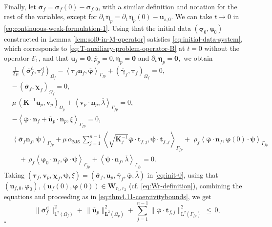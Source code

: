 \documentclass[11pt]{article}
\numberwithin{equation}{section}
\newcommand{\ds}{\displaystyle}
\newcommand{\bgamma}{{\boldsymbol\gamma}}
\newcommand{\bbeta}{{\boldsymbol\eta}}
\newcommand{\bsi}{{\boldsymbol\sigma}}
\newcommand{\bvarphi}{{\boldsymbol\varphi}}
\newcommand{\bpsi}{{\boldsymbol\psi}}
\newcommand{\btau}{{\boldsymbol\tau}}
\newcommand{\bchi}{{\boldsymbol\chi}}
\newcommand{\ubsi}{\underline{\bsi}}
\newcommand{\ubu}{\underline{\bu}}
\newcommand{\bv}{{\mathbf{v}}}
\newcommand{\bu}{\mathbf{u}}
\newcommand{\bt}{{\mathbf{t}}}
\newcommand{\bn}{{\mathbf{n}}}
\newcommand{\0}{{\mathbf{0}}}
\def\bK{\mathbf{K}}
\def\bW{\mathbf{W}}
\newcommand{\bL}{\mathbf{L}}
\newcommand\bbL{\mathbb{L}}
\newcommand{\cE}{\mathcal{E}}
\def\L{\mathrm{L}}
\def\rd{\mathrm{d}}
\def\BJS{\mathtt{BJS}}
\def\pil{\left<}
\def\pir{\right>}
\newenvironment{proof}{\noindent{\it Proof.}}{\hfill$\square$}
\numberwithin{equation}{section}
\begin{document}
\begin{proof}
Finally, let $\overline{\bsi}_f =\bsi_f(0) - \bsi_{f,0}$, with a similar definition and notation for the rest of the variables, except for $\overline{\partial_t\,\bbeta}_{p} = \partial_t\,\bbeta_{p}(0) - \bu_{s,0}$. 
We can take $t \to 0$ in \eqref{eq:continuous-weak-formulation-1}. 
Using that the initial data $(\ubsi_0,\ubu_0)$ constructed in Lemma \ref{lem:sol0-in-M-operator} satisfies \eqref{eq:initial-data-system}, which corresponds to \eqref{eq:T-auxiliary-problem-operator-B} at $t=0$ without the operator $\cE_1$, and that $\overline{\bu}_{f} = \0, \overline{p}_{p} = 0, \overline{\bbeta}_{p} = \0 $ and $\overline{\partial_t\,\bbeta}_{p} = \0,$ we obtain
\begin{subequations}\label{eq:init-0}
\begin{align}
&\ds  \frac{1}{2\,\mu}\,(\overline{\bsi}^\rd_f,\btau^\rd_f)_{\Omega_f} - \pil\btau_f\bn_f,\overline{\bvarphi} \pir_{\Gamma_{fp}} + (\overline{\bgamma}_f,\btau_f)_{\Omega_f} =0, \label{init-1} \\[1ex]
& \ds -\,(\overline{\bsi}_f,\bchi_f)_{\Omega_f} = 0, \label{init-2} \\[1ex]
& \ds \mu\,(\bK^{-1}\overline{\bu}_p,\bv_p)_{\Omega_p} + \pil\bv_p\cdot\bn_p,\overline{\lambda}\pir_{\Gamma_{fp}} = 0, \label{init-3} \\[1ex]
& \ds - \pil\overline{\bvarphi}\cdot\bn_f + \overline{\bu}_p\cdot\bn_p,\xi\pir_{\Gamma_{fp}} = 0, \label{init-4} \\[1ex]
& \ds \pil\overline{\bsi}_f\bn_f,\bpsi\pir_{\Gamma_{fp}} + \mu\,\alpha_{\BJS}\,\sum_{j=1}^{n-1} \pil\sqrt{\bK^{-1}_j} \overline{\bvarphi} \cdot\bt_{f,j},\bpsi\cdot\bt_{f,j} \pir_{\Gamma_{fp}}   +\,\, \rho_f\pil \overline{\bvarphi}\cdot\bn_f, \bvarphi(0)\cdot\bpsi \pir_{\Gamma_{fp}} \nonumber \\[2ex]
& \ds\quad +\, \rho_f\pil \bvarphi_0\cdot\bn_f, \overline{\bvarphi}\cdot\bpsi \pir_{\Gamma_{fp}}+ \pil\bpsi\cdot\bn_f,\overline{\lambda}\pir_{\Gamma_{fp}} = 0.\label{init-5} 
\end{align}
\end{subequations}
Taking $(\btau_f,\bv_p,\bchi_f,\bpsi, \xi) = (\overline{\bsi}_f,\overline{\bu}_p,\overline{\bgamma}_f,\overline{\bvarphi},\overline{\lambda})$ in \eqref{eq:init-0}, using that $(\bu_{f,0},\bvarphi_0), (\bu_{f}(0),\bvarphi(0))\in \bW_{r_1,r_2}$ (cf. \eqref{eq:Wr-definition}), combining the equations and proceeding as in  \eqref{eq:thm4.11-coercivitybounds}, we get
\begin{equation*}
\,\|\overline{\bsi}^\rd_f \|^2_{\bbL^2(\Omega_f)} + \,\|\overline{\bu}_p\|^2_{\bL^2(\Omega_p)} + \,\sum^{n-1}_{j=1} \|\overline{\bvarphi}\cdot \bt_{f,j} \|^2_{\L^2(\Gamma_{fp})}\,\leq\, 0,  

\end{equation*}
\end{proof}
\end{document}
